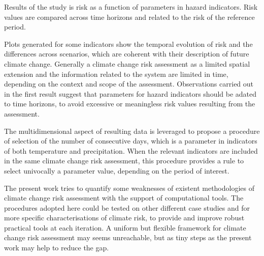 Results of the study is risk as a function of parameters in hazard indicators. Risk values are compared across time horizons and related to the risk of the reference period.

Plots generated for some indicators show the temporal evolution of risk and the differences across scenarios, which are coherent with their description of future climate change. Generally a climate change risk assessment as a limited spatial extension and the information related to the system are limited in time, depending on the context and scope of the assessment. Observations carried out in the first result suggest that parameters for hazard indicators should be adated to time horizons, to avoid excessive or meaningless risk values resulting from the assessment.

The multidimensional aspect of resulting data is leveraged to propose a procedure of selection of the number of consecutive days, which is a parameter in indicators of both temperature and precipitation. When the relevant indicators are included in the same climate change risk assessment, this procedure provides a rule to select univocally a parameter value, depending on the period of interest.

The present work tries to quantify some weaknesses of existent methodologies of climate change risk assessment with the support of computational tools. The procedures adopted here could be tested on other different case studies and for more specific characterisations of climate risk, to provide and improve robust practical tools at each iteration.
A uniform but flexible framework for climate change risk assessment may seems unreachable, but as tiny steps as the present work may help to reduce the gap.
